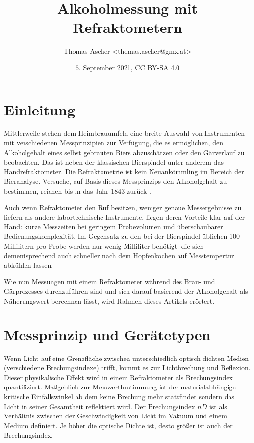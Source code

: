 \documentclass[a4paper,parskip=half]{scrartcl}
\title{Alkoholmessung mit Refraktometern}
\author{Thomas Ascher <thomas.ascher@gmx.at>}
\date{6. September 2021, \href{http://creativecommons.org/licenses/by-sa/4.0/}{CC BY-SA 4.0}}
\begin{document}
\maketitle

\section*{Einleitung}

Mittlerweile stehen dem Heimbrauumfeld eine breite Auswahl von Instrumenten
mit verschiedenen Messprinzipien zur Verfügung, die es ermöglichen, den
Alkoholgehalt eines selbst gebrauten Biers abzuschätzen oder den
Gärverlauf zu beobachten. Das ist neben der klassischen Bierspindel
unter anderem das Handrefraktometer. Die Refraktometrie ist
kein Neuankömmling im Bereich der Bieranalyse. Versuche,
auf Basis dieses Messprinzips den Alkoholgehalt zu bestimmen, reichen bis
in das Jahr 1843 zurück \autocite{Gamer1959}.

Auch wenn Refraktometer den Ruf besitzen, weniger genaue Messergebnisse
zu liefern als andere labortechnische Instrumente, liegen deren
Vorteile klar auf der Hand: kurze Messzeiten bei geringem Probevolumen
und überschaubarer Bedienungskomplexität. Im Gegensatz zu den bei der
Bierspindel üblichen 100 Millilitern pro Probe werden nur wenig
Milliliter benötigt, die sich dementsprechend auch schneller nach dem
Hopfenkochen auf Messtempertur abkühlen lassen. \autocite{Bettner1969, Terrill2011}

Wie nun Messungen mit einem Refraktometer während des Brau- und
Gärprozesses durchzuführen sind und sich darauf basierend der
Alkoholgehalt als Näherungswert berechnen lässt, wird
Rahmen dieses Artikels erörtert.

\section*{Messprinzip und Gerätetypen}

Wenn Licht auf eine Grenzfläche zwischen unterschiedlich optisch
dichten Medien (verschiedene Brechungsindexe) trifft,
kommt es zur Lichtbrechung und Reflexion. Dieser physikalische Effekt
wird in einem Refraktometer als Brechungsindex quantifiziert.
Maßgeblich zur Messwertbestimmung ist der materialabhängige
kritische Einfallswinkel ab dem keine Brechung mehr stattfindet
sondern das Licht in seiner Gesamtheit reflektiert wird.
Der Brechungsindex \(\mathit{nD}\) ist als Verhältnis zwischen der
Geschwindigkeit von Licht im Vakuum und einem Medium definiert. Je höher
die optische Dichte ist, desto größer ist auch der Brechungsindex.
\autocite{AKRSSOGH2021,Bonham2001,Gamer1959}
\end{document}
